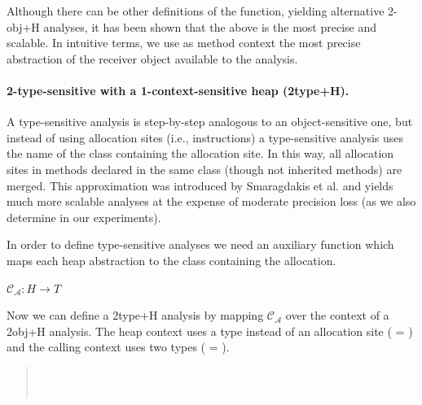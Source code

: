 Although there can be other definitions of the 
function, yielding alternative 2-obj+H analyses, it has been shown
\cite{pointsto-popl11} that the above is the most precise and
scalable. In intuitive terms, we use as method context the most
precise abstraction of the receiver object available to the analysis.


\paragraph{2-type-sensitive with a 1-context-sensitive heap (2type+H).}

A type-sensitive analysis is step-by-step analogous to an
object-sensitive one, but instead of using allocation sites (i.e.,
instructions) a type-sensitive analysis uses the name of the class
containing the allocation site. In this way, all allocation sites in
methods declared in the same class (though not inherited methods) are
merged. This approximation was introduced by Smaragdakis et
al. \cite{pointsto-popl11} and yields much more scalable analyses at
the expense of moderate precision loss (as we also determine in our
experiments).

In order to define type-sensitive analyses we need an auxiliary
function which maps each heap abstraction to the class containing the
allocation.

$\mathcal{C_A}: H \rightarrow T$

Now we can define a 2type+H analysis by mapping $\mathcal{C_A}$
over the context of a 2obj+H analysis. The heap context uses a type instead of an
allocation site ( = ) and the calling context uses two types
( = ).
\begin{quote}
 \\
 \\
\end{quote}



